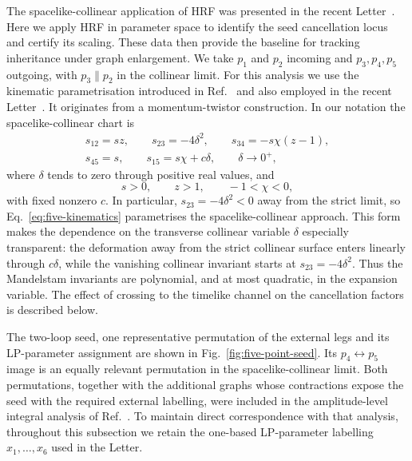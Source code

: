 \documentclass[a4paper,11pt]{article}
\begin{document}
The spacelike-collinear application of HRF was presented in the recent
Letter~\cite{Chen:2026dnj}.  Here we apply HRF in parameter space to identify
the seed cancellation locus and certify its scaling.  These data then
provide the baseline for tracking inheritance under graph enlargement.  We
take \(p_1\) and \(p_2\) incoming and
\(p_3,p_4,p_5\) outgoing, with \(p_3\parallel p_2\) in the collinear limit.
For this analysis we use the kinematic parametrisation introduced in
Ref.~\cite{Henn:2024qjq} and also employed in the recent
Letter~\cite{Chen:2026dnj}.  It originates from
a momentum-twistor construction.  In our notation the spacelike-collinear
chart is
\begin{equation}
 \begin{gathered}
 s_{12}=sz,\qquad s_{23}=-4\delta^2,\qquad
 s_{34}=-s\chi(z-1),\\
 s_{45}=s,\qquad s_{15}=s\chi+c\delta,\qquad \delta\to0^+,
 \end{gathered}
 \label{eq:five-kinematics}
\end{equation}
where \(\delta\) tends to zero through positive real values, and
\begin{equation}
 s>0,\qquad z>1,\qquad -1<\chi<0,
 \label{eq:five-domain}
\end{equation}
with fixed nonzero \(c\).  In particular,
\(s_{23}=-4\delta^2<0\) away from the strict limit, so
Eq.~\eqref{eq:five-kinematics} parametrises the spacelike-collinear approach.
This form makes the dependence on the transverse
collinear variable \(\delta\) especially transparent: the deformation away
from the strict collinear surface enters linearly through \(c\delta\), while
the vanishing collinear invariant starts at \(s_{23}=-4\delta^2\).  Thus the
Mandelstam invariants are polynomial, and at most quadratic, in the expansion
variable.  The effect of crossing to the timelike channel on the cancellation
factors is described below.

The two-loop seed, one representative permutation of the external legs and its
LP-parameter assignment are shown in Fig.~\ref{fig:five-point-seed}.  Its
\(p_4\leftrightarrow p_5\) image is an equally relevant permutation in the
spacelike-collinear limit.  Both permutations, together with the additional
graphs whose contractions expose the seed with the required external
labelling, were included in the amplitude-level integral analysis of
Ref.~\cite{Chen:2026dnj}.  To maintain
direct correspondence with that analysis, throughout this subsection we
retain the one-based LP-parameter labelling \(x_1,\ldots,x_6\) used in the
Letter.
\end{document}

